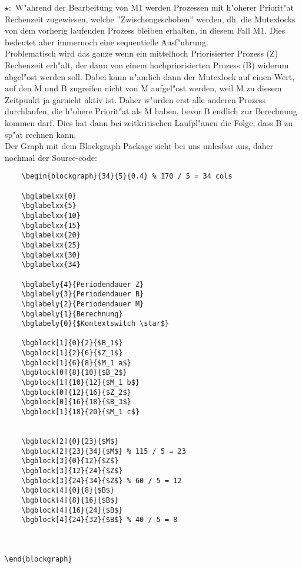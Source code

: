 \documentclass[a4paper,11pt]{article}
\begin{document}
\begin{enumerate}
\begin{itemize}
\begin{blockgraph}{34}{5}{0.4}
\end{blockgraph}

$\star :$ W"ahrend der Bearbeitung von M1 werden Prozessen mit h"oherer Priorit"at Rechenzeit zugewiesen, welche ''Zwischengeschoben'' werden, dh. die Mutexlocks von dem vorherig laufenden Prozess bleiben erhalten, in diesem Fall M1. Dies bedeutet aber immernoch eine sequentielle Ausf"uhrung.
\\

Problematisch wird das ganze wenn ein mittelhoch Priorisierter Prozess (Z) Rechenzeit erh"alt, der dann von einem hochpriorisierten Prozess (B) widerum abgel"ost werden soll. Dabei kann n"amlich dann der Mutexlock auf einen Wert, auf den M und B zugreifen nicht von M aufgel"ost werden, weil M zu diesem Zeitpunkt ja garnicht aktiv ist.
Daher w"urden erst alle anderen Prozess durchlaufen, die h"ohere Priorit"at als M haben, bevor B endlich zur Berechnung kommen darf. Dies hat dann bei zeitkritischen Laufpl"anen die Folge, dass B zu sp"at rechnen kann.
\\

Der Graph mit dem Blockgraph Package sieht bei uns unlesbar aus, daher nochmal der Source-code:

\begin{lstlisting}
    \begin{blockgraph}{34}{5}{0.4} % 170 / 5 = 34 cols

    \bglabelxx{0}
    \bglabelxx{5}
    \bglabelxx{10}
    \bglabelxx{15}
    \bglabelxx{20}
    \bglabelxx{25}
    \bglabelxx{30}
    \bglabelxx{34}

    \bglabely{4}{Periodendauer Z}
    \bglabely{3}{Periodendauer B}
    \bglabely{2}{Periodendauer M}
    \bglabely{1}{Berechnung}
    \bglabely{0}{$Kontextswitch \star$}

    \bgblock[1]{0}{2}{$B_1$}
    \bgblock[1]{2}{6}{$Z_1$}
    \bgblock[1]{6}{8}{$M_1 a$}
    \bgblock[0]{8}{10}{$B_2$}
    \bgblock[1]{10}{12}{$M_1 b$}
    \bgblock[0]{12}{16}{$Z_2$}
    \bgblock[0]{16}{18}{$B_3$}
    \bgblock[1]{18}{20}{$M_1 c$}


    \bgblock[2]{0}{23}{$M$}
    \bgblock[2]{23}{34}{$M$} % 115 / 5 = 23
    \bgblock[3]{0}{12}{$Z$}
    \bgblock[3]{12}{24}{$Z$}
    \bgblock[3]{24}{34}{$Z$} % 60 / 5 = 12
    \bgblock[4]{0}{8}{$B$}
    \bgblock[4]{8}{16}{$B$}
    \bgblock[4]{16}{24}{$B$}
    \bgblock[4]{24}{32}{$B$} % 40 / 5 = 8



\end{blockgraph}
\end{lstlisting}
\end{itemize}

\end{enumerate}
\end{document}
